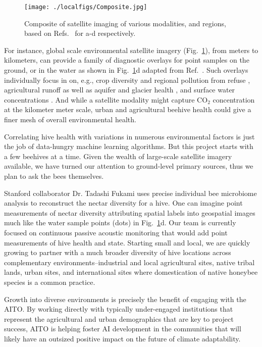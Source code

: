 \begin{figure}
	\centerline{
		\texttt{[image: ./localfigs/Composite.jpg]}
		}
		\vspace{-1\baselineskip}
	\caption{\label{fig::composite}
		Composite of satellite imaging of various modalities, and regions, based on Refs.~\cite{YaraGlaciers,TomasBeaches,GlobalCO2,SurfaceWater} for a-d respectively.
		}
\end{figure}

For instance, global scale environmental satellite imagery (Fig.~\ref{fig::composite}), from meters to kilometers, can provide a family of diagnostic overlays for point samples on the ground, or in the water as shown in Fig.~\ref{fig::composite}d adapted from Ref.~\cite{SurfaceWater}.
Such overlays individually focus in on, e.g., crop diversity and regional pollution from refuse \cite{TomasBeaches}, agricultural runoff \cite{NeonicsOnBees} as well as aquifer \cite{GRACE_CongoBasinWatershed} and glacier health \cite{YaraGlaciers}, and surface water concentrations \cite{SurfaceWater}. 
And while a satellite modality might capture CO$_2$ concentration \cite{GlobalCO2} at the kilometer meter scale, urban and agricultural beehive health could give a finer mesh of overall environmental health.

Correlating hive health with variations in numerous environmental factors is just the job of data-hungry machine learning algorithms. 
But this project starts with a few beehives at a time. 
Given the wealth of large-scale satellite imagery available, we have turned our attention to ground-level primary sources, thus we plan to ask the bees themselves.

Stanford collaborator Dr. Tadashi Fukami uses precise individual bee microbiome analysis \cite{Fukami2022} to reconstruct the nectar diversity for a hive. 
One can imagine point measurements of nectar diversity attributing spatial labels into geospatial images much like the water sample points (dots) in Fig.~\ref{fig::composite}d.
Our team is currently focused on continuous passive acoustic monitoring that would add point measurements of hive health and state. 
Starting small and local, we are quickly growing to partner with a much broader diversity of hive locations across complementary environments--industrial and local agricultural sites, native tribal lands, urban sites, and international sites where domestication of native honeybee species is a common practice.

Growth into diverse environments is precisely the benefit of engaging with the AITO.
By working directly with typically under-engaged institutions that represent the agricultural and urban demographics that are key to project success, AITO is helping foster AI development in the communities that will likely have an outsized positive impact on the future of climate adaptability.

